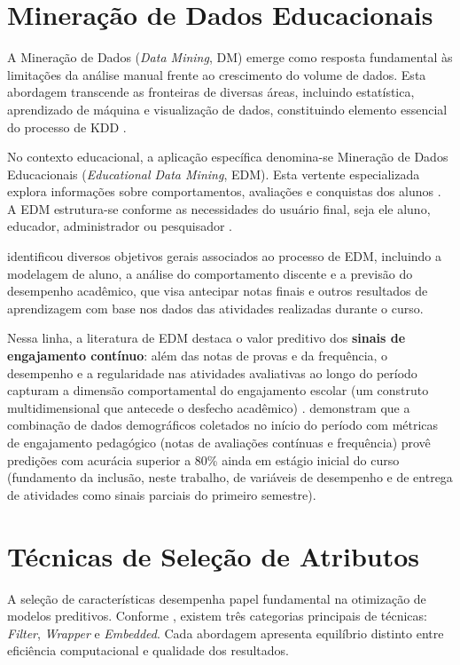 \section{Mineração de Dados Educacionais}

A Mineração de Dados (\textit{Data Mining}, DM) emerge como resposta fundamental às limitações da análise manual frente ao crescimento do volume de dados. Esta abordagem transcende as fronteiras de diversas áreas, incluindo estatística, aprendizado de máquina e visualização de dados, constituindo elemento essencial do processo de KDD \cite{castro2016}.

No contexto educacional, a aplicação específica denomina-se Mineração de Dados Educacionais (\textit{Educational Data Mining}, EDM). Esta vertente especializada explora informações sobre comportamentos, avaliações e conquistas dos alunos \cite{costa2012}. A EDM estrutura-se conforme as necessidades do usuário final, seja ele aluno, educador, administrador ou pesquisador \cite{romero2010}.

 identificou diversos objetivos gerais associados ao processo de EDM, incluindo a modelagem de aluno, a análise do comportamento discente e a previsão do desempenho acadêmico, que visa antecipar notas finais e outros resultados de aprendizagem com base nos dados das atividades realizadas durante o curso.

Nessa linha, a literatura de EDM destaca o valor preditivo dos \textbf{sinais de engajamento contínuo}: além das notas de provas e da frequência, o desempenho e a regularidade nas atividades avaliativas ao longo do período capturam a dimensão comportamental do engajamento escolar (um construto multidimensional que antecede o desfecho acadêmico) \cite{fredricks2004}.  demonstram que a combinação de dados demográficos coletados no início do período com métricas de engajamento pedagógico (notas de avaliações contínuas e frequência) provê predições com acurácia superior a 80\% ainda em estágio inicial do curso (fundamento da inclusão, neste trabalho, de variáveis de desempenho e de entrega de atividades como sinais parciais do primeiro semestre).

\section{Técnicas de Seleção de Atributos}

A seleção de características desempenha papel fundamental na otimização de modelos preditivos. Conforme , existem três categorias principais de técnicas: \textit{Filter}, \textit{Wrapper} e \textit{Embedded}. Cada abordagem apresenta equilíbrio distinto entre eficiência computacional e qualidade dos resultados.

